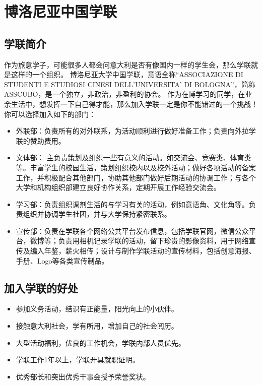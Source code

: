 \chapter{博洛尼亚中国学联}              

\section{学联简介}
作为旅意学子，可能很多人都会问意大利是否有像国内一样的学生会，那么学联就是这样的一个组织。
博洛尼亚大学中国学联，意语全称“ASSOCIAZIONE DI STUDENTI E STUDIOSI CINESI DELL’UNIVERSITA' DI BOLOGNA”，简称ASSCUBO，是一个独立，非政治，非盈利的协会。
作为在博学习的同学，在业余生活中，想发挥一下自己得才能，那么加入学联一定是你不能错过的一个挑战！
你可以选择加入如下的部门：
\begin{itemize}
\item 外联部：负责所有的对外联系，为活动顺利进行做好准备工作；负责向外拉学联的赞助费用。
\item 文体部： 主负责策划及组织一些有意义的活动。如交流会、竞赛类、体育类等。丰富学生的校园生活，策划组织校内以及校外活动；做好各项活动的备案工作，并积极配合其他部门，协助其他部门做好后期活动的协调工作；与各个大学和机构组织部建立良好协作关系，定期开展工作经验交流会。
\item 学习部：负责组织调剂生活的与学习有关的活动，例如意语角、文化角等。负责组织并协调学生社团，并与大学保持紧密联系。
\item 宣传部：负责在学联各个网络公共平台发布信息，包括学联官网，微信公众平台，微博等；负责用相机记录学联的活动，留下珍贵的影像资料，用于网络宣传及编入年鉴，薪火相传；设计与制作学联活动的宣传材料，包括创意海报、手册、Logo等各类宣传制品。

\end{itemize}

\section{加入学联的好处}
\begin{itemize}
\item 参加义务活动，结识有正能量，阳光向上的小伙伴。
\item 接触意大利社会，学有所用，增加自己的社会阅历。
\item 大型活动福利，优良的工作机会，学联内部人员优先。
\item 学联工作1年以上，学联开具就职证明。
\item 优秀部长和突出优秀干事会授予荣誉奖状。
\end{itemize}

